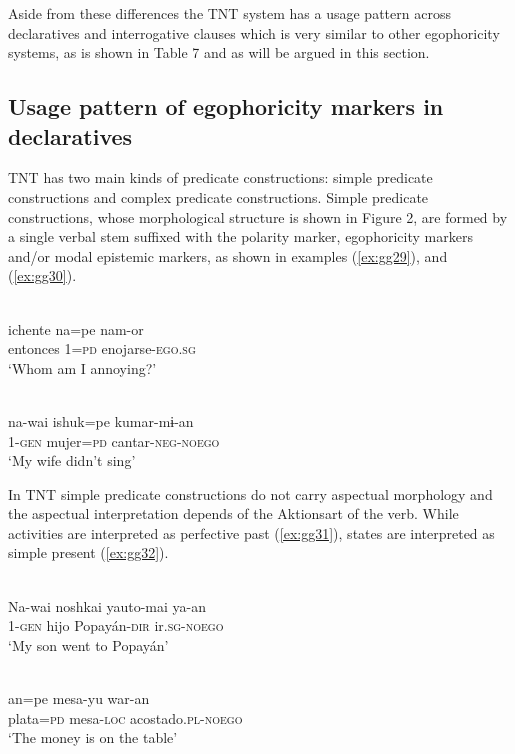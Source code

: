 \documentclass[output=paper]{langsci/langscibook}
\begin{document}
Aside from these differences the TNT system has a usage pattern across declaratives and interrogative clauses which is very similar to other egophoricity systems, as is shown in Table 7 and as will be argued in this section. 


\subsection{Usage pattern of egophoricity markers in declaratives}\label{s:gg3-1}

TNT has two main kinds of predicate constructions: simple predicate constructions and complex predicate constructions. Simple predicate constructions, whose morphological structure is shown in Figure 2, %
are formed by a single verbal stem suffixed with the polarity marker, egophoricity markers and/or modal epistemic markers, as shown in examples (\ref{ex:gg29}), and (\ref{ex:gg30}). 


\ea \label{ex:gg29}
\\
    \gll ichente na=pe nam-or\\
         entonces 1=\textsc{pd} enojarse-\textsc{ego.sg}\\
    \glt ‘Whom am I annoying?'
\z

\ea \label{ex:gg30}
\\
    \gll na-wai	ishuk=pe kumar-mɨ-an\\
         1-\textsc{gen}	mujer=\textsc{pd}	cantar-\textsc{neg-noego}\\
    \glt ‘My wife didn’t sing’
\z

In TNT simple predicate constructions do not carry aspectual morphology and the aspectual interpretation depends of the Aktionsart of the verb. While activities are interpreted as perfective past (\ref{ex:gg31}), states are interpreted as simple present (\ref{ex:gg32}).

\ea \label{ex:gg31}
\\
    \gll Na-wai	noshkai	yauto-mai ya-an\\
         1-\textsc{gen} hijo Popayán-\textsc{dir} ir.\textsc{sg-noego}\\
    \glt ‘My son went to Popayán'
\z

\ea \label{ex:gg32}
\\
    \gll an=pe	mesa-yu	war-an\\
         plata=\textsc{pd}	mesa-\textsc{loc} acostado.\textsc{pl-noego}\\
    \glt ‘The money is on the table’
\z
\end{document}
